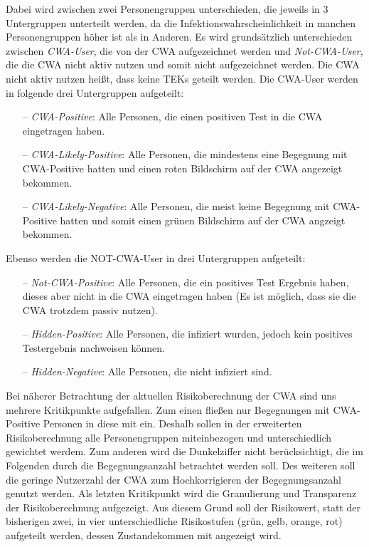 \documentclass[conference,compsoc]{IEEEtran}
\begin{document}
Dabei wird zwischen zwei Personengruppen unterschieden, die jeweils in 3 Untergruppen unterteilt werden, 
da die Infektionswahrscheinlichkeit in manchen Personengruppen höher ist als in Anderen.
Es wird grundsätzlich unterschieden zwischen \textit{CWA-User}, die von der CWA aufgezeichnet werden und \textit{Not-CWA-User}, 
die die CWA nicht aktiv nutzen und somit nicht aufgezeichnet werden. Die CWA nicht aktiv nutzen heißt, dass keine TEKs geteilt werden.
Die CWA-User werden in folgende drei Untergruppen aufgeteilt:
\begin{itemize}
\item[--]\textit{CWA-Positive}: Alle Personen, die einen positiven Test in die CWA eingetragen haben.
\item[--]\textit{CWA-Likely-Positive}: Alle Personen, die mindestens eine Begegnung mit CWA-Positive hatten und einen roten Bildschirm auf der CWA angezeigt bekommen.
\item[--]\textit{CWA-Likely-Negative}: Alle Personen, die meist keine Begegnung mit CWA-Positive hatten und somit einen grünen Bildschirm auf der CWA angzeigt bekommen.
\end{itemize}
Ebenso werden die NOT-CWA-User in drei Untergruppen aufgeteilt: 
\begin{itemize}
\item[--]\textit{Not-CWA-Positive}: Alle Personen, die ein positives Test Ergebnis haben, dieses aber nicht in die CWA eingetragen haben (Es ist möglich, dass sie die CWA trotzdem passiv nutzen).
\item[--]\textit{Hidden-Positive}: Alle Personen, die infiziert wurden, jedoch kein positives Testergebnis nachweisen können. 
\item[--]\textit{Hidden-Negative}: Alle Personen, die nicht infiziert sind.
\end{itemize}

Bei näherer Betrachtung der aktuellen Risikoberechnung der CWA sind uns mehrere Kritikpunkte aufgefallen.
Zum einen fließen nur Begegnungen mit CWA-Positive Personen in diese mit ein.
Deshalb sollen in der erweiterten Risikoberechnung alle Personengruppen miteinbezogen und unterschiedlich gewichtet werdem.
Zum anderen wird die Dunkelziffer nicht berücksichtigt, die im Folgenden durch die Begegnungsanzahl betrachtet werden soll.
Des weiteren soll die geringe Nutzerzahl der CWA zum Hochkorrigieren der Begegnungsanzahl genutzt werden.
Als letzten Kritikpunkt wird die Granulierung und Transparenz der Risikoberechnung aufgezeigt. 
Aus diesem Grund soll der Risikowert, statt der bisherigen zwei, in vier unterschiedliche Risikostufen (grün, gelb, orange, rot) aufgeteilt werden, dessen Zustandekommen mit angezeigt wird.
\end{document}
